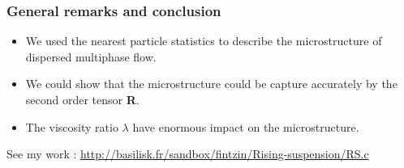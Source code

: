 \documentclass{sintefbeamer}
\begin{document}
\begin{frame}
  \frametitle{General remarks and conclusion}

  \begin{itemize}
    \item We used the nearest particle statistics to describe the microstructure of dispersed multiphase flow. 
    \item We could show that the microstructure could be capture accurately by the second order tensor \textbf{R}. 
    \item The viscosity ratio $\lambda$ have enormous impact on the microstructure. 
  \end{itemize}
\vfill    
See my work : \url{http://basilisk.fr/sandbox/fintzin/Rising-suspension/RS.c}

\end{frame}


 
\backmatter
\end{document}
